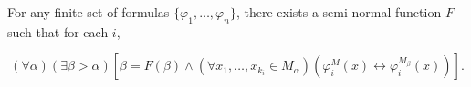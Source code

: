 For any finite set of formulas $\{\varphi_1, \ldots, \varphi_n\}$, there exists a semi-normal function $F$ such that for each $i$,

$$(\forall \alpha)(\exists \beta > \alpha)[\beta = F(\beta) \land (\forall x_1, \ldots, x_{k_i} \in M_\alpha)(\varphi_i^{M}(x) \leftrightarrow \varphi_i^{M_\beta}(x))].$$
